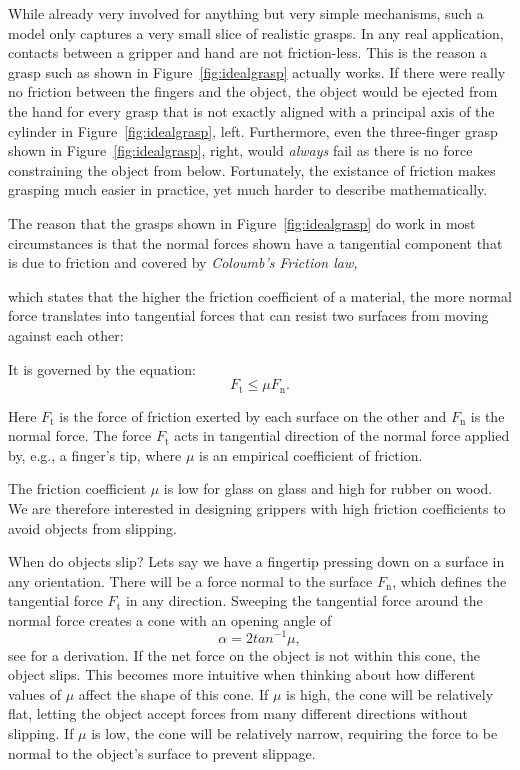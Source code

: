 While already very involved for anything but very simple mechanisms, such a model only captures a very small slice of realistic grasps. In any real application, contacts between a gripper and hand are not friction-less. This is the reason a grasp such as shown in Figure~\ref{fig:idealgrasp} actually works. If there were really no friction between the fingers and the object, the object would be ejected from the hand for every grasp that is not exactly aligned with a principal axis of the cylinder in Figure~\ref{fig:idealgrasp}, left. Furthermore, even the three-finger grasp shown in  Figure~\ref{fig:idealgrasp}, right, would \emph{always} fail as there is no force constraining the object from below. Fortunately, the existance of friction makes grasping much easier in practice, yet much harder to describe mathematically.

The reason that the grasps shown in Figure~\ref{fig:idealgrasp} do work in most circumstances is that the normal forces shown have a tangential component that is due to friction and covered by \emph{Coloumb's Friction law,}

which states that the higher the friction coefficient of a material, the more normal force translates into tangential forces that can resist two surfaces from moving against each other:

It is governed by the equation:
\begin{equation}
F_\mathrm{t} \leq \mu F_\mathrm{n}.
\end{equation}

Here $F_\mathrm{t}$  is the force of friction exerted by each surface on the other and $F_\mathrm{n}$ is the normal force. The force $F_\mathrm{t}$ acts in tangential direction of the normal force applied by, e.g., a finger's tip, where $\mu$ is an empirical coefficient of friction.

The friction coefficient $\mu$ is low for glass on glass and high for rubber on wood.  We are therefore interested in designing grippers with high friction coefficients to avoid objects from slipping.

When do objects slip? Lets say we have a fingertip pressing down on a surface in any orientation. There will be a force normal to the surface $F_\mathrm{n}$, which defines the tangential force $F_\mathrm{t}$ in any direction. Sweeping the tangential force around the normal force creates a cone with an opening angle of
\begin{equation}
\alpha=2tan^{-1}\mu,
\end{equation}
see \cite[p. 57]{rimon2019mechanics} for a derivation.
If the net force on the object is not within this cone, the object slips.  This becomes more intuitive when thinking about how different values of $\mu$ affect the shape of this cone. If $\mu$ is high, the cone will be relatively flat, letting the object accept forces from many different directions without slipping. If $\mu$ is low, the cone will be relatively narrow, requiring the force to be normal to the object's surface to prevent slippage.

